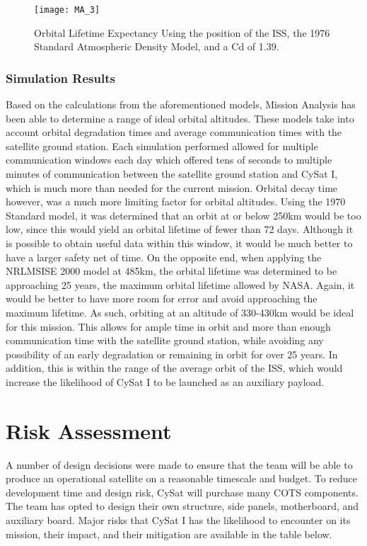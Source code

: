 \documentclass[nocover]            %
{CSLI}                       %
\begin{document}
\begin{figure}[H]
    \texttt{[image: MA\_3]}
    \caption{Orbital Lifetime Expectancy Using the position of the ISS, the 1976 Standard Atmospheric Density Model, and a Cd of 1.39.}
\end{figure}


\subsubsection{Simulation Results}
Based on the calculations from the aforementioned models, Mission Analysis has been able to determine a range of ideal orbital altitudes. These models take into account orbital degradation times and average communication times with the satellite ground station. Each simulation performed allowed for multiple communication windows each day which offered tens of seconds to multiple minutes of communication between the satellite ground station and CySat I, which is much more than needed for the current mission. Orbital decay time however, was a much more limiting factor for orbital altitudes. Using the 1970 Standard model, it was determined that an orbit at or below 250km would be too low, since this would yield an orbital lifetime of fewer than 72 days. Although it is possible to obtain useful data within this window, it would be much better to have a larger safety net of time. On the opposite end, when applying the NRLMSISE 2000 model at 485km, the orbital lifetime was determined to be approaching 25 years, the maximum orbital lifetime allowed by NASA. Again, it would be better to have more room for error and avoid approaching the maximum lifetime. As such, orbiting at an altitude of 330-430km would be ideal for this mission. This allows for ample time in orbit and more than enough communication time with the satellite ground station, while avoiding any possibility of an early degradation or remaining in orbit for over 25 years. In addition, this is within the range of the average orbit of the ISS, which would increase the likelihood of CySat I to be launched as an auxiliary payload.
\section{Risk Assessment}
A number of design decisions were made to ensure that the team will be able to produce an operational satellite on a reasonable timescale and budget. To reduce development time and design risk, CySat will purchase many COTS components. The team has opted to design their own structure, side panels, motherboard, and auxiliary board. Major risks that CySat I has the likelihood to encounter on its mission, their impact, and their mitigation are available in the table below.
\end{document}
